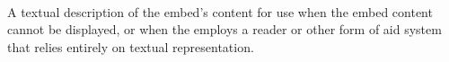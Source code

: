  \\

A textual description of the embed's content for use when the embed content cannot be displayed, or when the  employs a reader or other form of aid system that relies entirely on textual representation.

